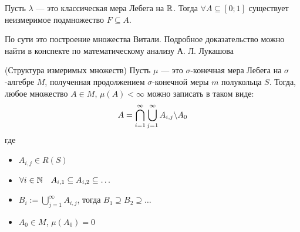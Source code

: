 \begin{reminder}
	Пусть $\lambda$ --- это классическая мера Лебега на $\mathbb{R}$. Тогда $\forall A \subseteq [0; 1]$ существует неизмеримое подмножество $F \subseteq A$.
\end{reminder}

\begin{note}
	По сути это построение множества Витали. Подробное доказательство можно найти в конспекте по математическому анализу А. Л. Лукашова
\end{note}

\begin{theorem} (Структура измеримых множеств)
	Пусть $\mu$ --- это $\sigma$-конечная мера Лебега на $\sigma$-алгебре $M$, полученная продолжением $\sigma$-конечной меры $m$ полукольца $S$. Тогда, любое множество $A \in M$, $\mu(A) < \infty$ можно записать в таком виде:
	\[
		A = \bigcap_{i = 1}^\infty \bigcup_{j = 1}^\infty A_{i, j} \backslash A_0
	\]
	где
	\begin{itemize}
		\item $A_{i, j} \in R(S)$
		
		\item $\forall i \in \mathbb{N} \quad A_{i, 1} \subseteq A_{i, 2} \subseteq \ldots$
		
		\item $B_i := \bigcup_{j = 1}^\infty A_{i, j}$, тогда $B_1 \supseteq B_2 \supseteq \ldots$
		
		\item $A_0 \in M$, $\mu(A_0) = 0$
	\end{itemize}
\end{theorem}

